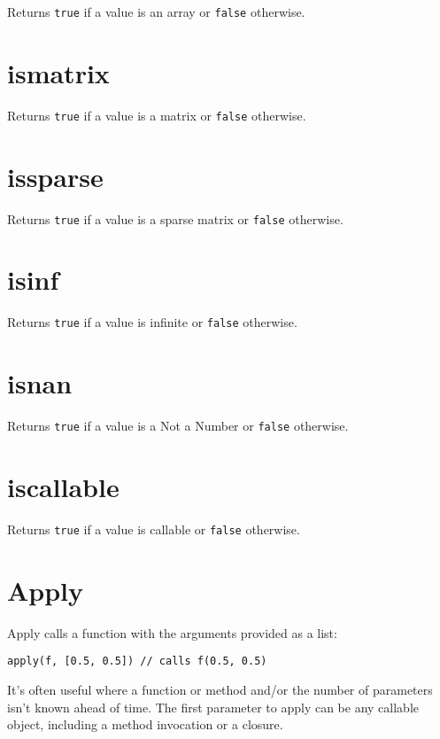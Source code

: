 Returns \texttt{true} if a value is an array or \texttt{false}
otherwise.

\hypertarget{ismatrix}{%
\section{ismatrix}\label{ismatrix}}

Returns \texttt{true} if a value is a matrix or \texttt{false}
otherwise.

\hypertarget{issparse}{%
\section{issparse}\label{issparse}}

Returns \texttt{true} if a value is a sparse matrix or \texttt{false}
otherwise.

\hypertarget{isinf}{%
\section{isinf}\label{isinf}}

Returns \texttt{true} if a value is infinite or \texttt{false}
otherwise.

\hypertarget{isnan}{%
\section{isnan}\label{isnan}}

Returns \texttt{true} if a value is a Not a Number or \texttt{false}
otherwise.

\hypertarget{iscallable}{%
\section{iscallable}\label{iscallable}}

Returns \texttt{true} if a value is callable or \texttt{false}
otherwise.

\hypertarget{apply}{%
\section{Apply}\label{apply}}

Apply calls a function with the arguments provided as a list:

\begin{lstlisting}
apply(f, [0.5, 0.5]) // calls f(0.5, 0.5) 
\end{lstlisting}

It's often useful where a function or method and/or the number of
parameters isn't known ahead of time. The first parameter to apply can
be any callable object, including a method invocation or a closure.

